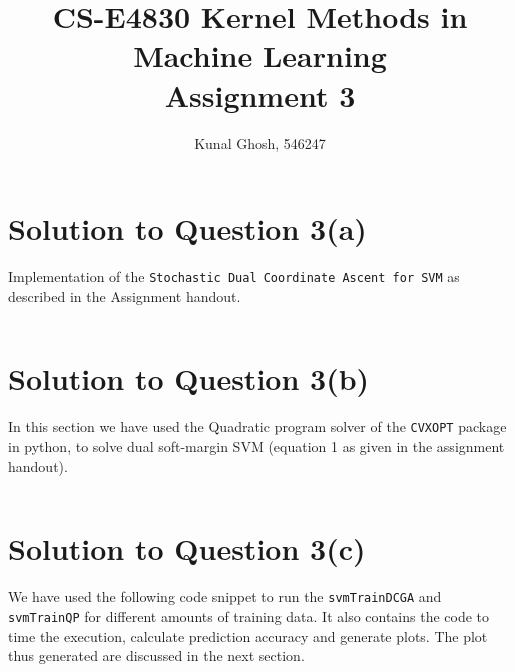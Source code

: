 \documentclass[a4paper,11pt]{article}
\begin{document}
\title{CS-E4830 Kernel Methods in Machine Learning \\ Assignment 3} %
\author{Kunal Ghosh, 546247} %
\maketitle
\section*{}

\section*{Solution to Question 3(a)}
Implementation of the \texttt{Stochastic Dual Coordinate Ascent for SVM} as described in the Assignment handout.
\inputminted[baselinestretch=1, fontsize=\small, breaklines=true, mathescape]{python}{../svmTrainDCGA2.py}
\section*{Solution to Question 3(b)}
In this section we have used the Quadratic program solver of the \texttt{CVXOPT} package in python, to solve
dual soft-margin SVM (equation 1 as given in the assignment handout).
\inputminted[baselinestretch=1, fontsize=\small, breaklines=true, mathescape]{python}{../svmTrainQP.py}
\section*{Solution to Question 3(c)}
We have used the following code snippet to run the \texttt{svmTrainDCGA} and \texttt{svmTrainQP} for different amounts
of training data. It also contains the code to time the execution, calculate prediction accuracy and generate plots.  
The plot thus generated are discussed in the next section.
\inputminted[baselinestretch=1, fontsize=\small, breaklines=true, mathescape]{python}{../Assignment3.py}
\end{document}
